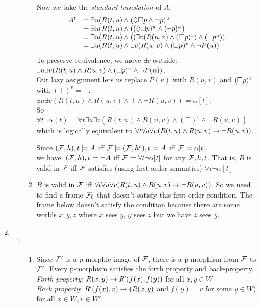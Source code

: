 \documentclass[a4paper, draft, 12pt]{article}
\begin{document}
\begin{enumerate}
\begin{enumerate}
\begin{enumerate}
  Now we take the \textit{standard translation} of $A$:
  $$ 
  \begin{array}{ll}
    A^{t} &= \exists u(R(t, u) \wedge (\Diamond\square p \wedge \neg p)^u  \\
          &= \exists u(R(t, u) \wedge ((\Diamond\square p)^u \wedge (\neg p)^u) \\
          &= \exists u(R(t, u) \wedge ( (\exists v(R(u,v) \wedge (\square p)^v) \wedge (\neg p^u)) \\
          &= \exists u(R(t, u) \wedge \exists v(R(u,v) \wedge (\square p)^v \wedge \neg P(u)) \\
  \end{array}
  $$
  To preserve equivalence, we move $\exists v$ outside: \\
  $\exists u \exists v(R(t, u) \wedge R(u,v) \wedge (\square p)^v \wedge \neg P(u))$. \\
  Our lazy assignment lets us replace $P(u)$ with $R(u,v)$ and $(\square p)^v$ with $(\top)^v=\top$. 
  $\exists u \exists v(R(t, u) \wedge R(u,v) \wedge \top \wedge \neg R(u,v)) = \alpha[t]$. \\
  So $\forall t \neg \alpha(t) = \forall t \exists u \exists v(R(t, u) \wedge R(u,v) \wedge (\top)^v \wedge \neg R(u,v))$
  which is logically equivalent to $\forall t \forall u \forall v (R(t,u) \wedge R(u,v) \rightarrow \neg R(u,v))$. 

  Since $(\mathcal{F}, h), t \models A$ iff $\mathcal{F} \models (\mathcal{F}, h^{o}), t \models A$ iff $\mathcal{F} \models \alpha[t]$. \\
  we have: $(\mathcal{F}, h), t \models \neg A$ iff $\mathcal{F} \models \forall t \neg \alpha[t]$ for any $\mathcal{F}, h, t$. 
  That is, $B$ is valid in $\mathcal{F}$ iff $\mathcal{F}$ satisfies (using first-order semantics) $\forall t \neg \alpha[t]$  \\
  \item 
  $B$ is valid in $\mathcal{F}$ iff $\forall t \forall u \forall v (R(t,u) \wedge R(u,v) \rightarrow \neg R(u,v))$. 
  So we need to find a frame $\mathcal{F}_0$ that doesn't satisfy this first-order condition. The frame below 
  doesn't satisfy the condition because there are some worlds $x,y,z$ 
  where $x$ sees $y$, $y$ sees $z$ but we have $z$ sees $y$. 
  \end{enumerate}
\end{enumerate}

%
\item %
\begin{enumerate}
\item %
  \begin{enumerate}
  \item %
  Since $\mathcal{F}'$ is a p-morphic image of $\mathcal{F}$, there is a p-morphism from $\mathcal{F}$ to $\mathcal{F}'$. 
  Every p-morphism satisfies the forth property and back-property. \\
  \textit{Forth property}: $R(x,y) \rightarrow R'(f(x),f(y))$ for all $x,y \in W$\\
  \textit{Back property}: $R'(f(x),v) \rightarrow (R(x,y)$ and $f(y) = v$ for some $y \in W$)\\
  for all $x \in W, v \in W'$.


\end{enumerate}
\end{enumerate}
\end{enumerate}
\end{document}
